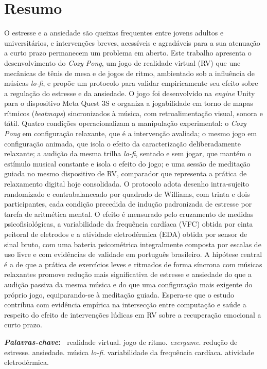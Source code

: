 \chapter*{Resumo}


O estresse e a ansiedade são queixas frequentes entre jovens adultos e universitários, e intervenções breves, acessíveis e agradáveis para a sua atenuação a curto prazo permanecem um problema em aberto. Este trabalho apresenta o desenvolvimento do \textit{Cozy Pong}, um jogo de realidade virtual (RV) que une mecânicas de tênis de mesa e de jogos de ritmo, ambientado sob a influência de músicas \textit{lo-fi}, e propõe um protocolo para validar empiricamente seu efeito sobre a regulação do estresse e da ansiedade. O jogo foi desenvolvido na \textit{engine} Unity para o dispositivo Meta Quest 3S e organiza a jogabilidade em torno de mapas rítmicos (\textit{beatmaps}) sincronizados à música, com retroalimentação visual, sonora e tátil. Quatro condições operacionalizam a manipulação experimental: o \textit{Cozy Pong} em configuração relaxante, que é a intervenção avaliada; o mesmo jogo em configuração animada, que isola o efeito da caracterização deliberadamente relaxante; a audição da mesma trilha \textit{lo-fi}, sentado e sem jogar, que mantém o estímulo musical constante e isola o efeito do jogo; e uma sessão de meditação guiada no mesmo dispositivo de RV, comparador que representa a prática de relaxamento digital hoje consolidada. O protocolo adota desenho intra-sujeito randomizado e contrabalanceado por quadrado de Williams, com trinta e dois participantes, cada condição precedida de indução padronizada de estresse por tarefa de aritmética mental. O efeito é mensurado pelo cruzamento de medidas psicofisiológicas, a variabilidade da frequência cardíaca (VFC) obtida por cinta peitoral de eletrodos e a atividade eletrodérmica (EDA) obtida por sensor de sinal bruto, com uma bateria psicométrica integralmente composta por escalas de uso livre e com evidências de validade em português brasileiro. A hipótese central é a de que a prática de exercícios leves e ritmados de forma síncrona com músicas relaxantes promove redução mais significativa de estresse e ansiedade do que a audição passiva da mesma música e do que uma configuração mais exigente do próprio jogo, equiparando-se à meditação guiada.   Espera-se que o estudo contribua com evidência empírica na intersecção entre computação e saúde a respeito do efeito de intervenções lúdicas em RV sobre a recuperação emocional a curto prazo.

\vspace{1em}
\noindent\textbf{\textit{Palavras-chave}:~} realidade virtual. jogo de ritmo. \textit{exergame}. redução de estresse. ansiedade. música \textit{lo-fi}. variabilidade da frequência cardíaca. atividade eletrodérmica.
